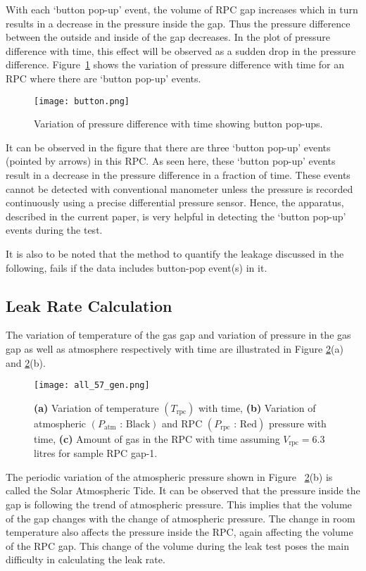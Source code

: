 With each `button pop-up' event, the volume of RPC gap increases which in turn results in a decrease in the pressure inside the gap. Thus the pressure difference between the outside and inside of the gap decreases. In the plot of pressure difference with time, this effect will be observed as a sudden drop in the pressure difference. Figure~\ref{fig:button} shows the variation of pressure difference with time for an RPC where there are `button pop-up' events. 
\begin{figure}
  \centering
  \texttt{[image: button.png]}
  \caption{Variation of pressure difference with time showing button pop-ups.}
  \label{fig:button}
\end{figure}
It can be observed in the figure that there are three `button pop-up' events (pointed by arrows) in this RPC. As seen here, these `button pop-up' events result in a decrease in the pressure difference in a fraction of time. These events cannot be detected with conventional manometer unless the pressure is recorded continuously using a precise differential pressure sensor. Hence, the apparatus, described in the current paper, is very helpful in detecting the `button pop-up' events during the test.

It is also to be noted that the method to quantify the leakage discussed in the following, fails if the data includes button-pop event(s) in it.

\subsection{Leak Rate Calculation}\label{sec:calculation}
The variation of temperature of the gas gap and variation of pressure in the gas gap as well as atmosphere respectively with time are illustrated in Figure \ref{fig:temp}(a) and \ref{fig:temp}(b). 
\begin{figure}[h]
  \centering
  \texttt{[image: all\_57\_gen.png]}
  \caption{\textbf{(a)} Variation of temperature $\left(T_{\textrm{rpc}}\right)$ with time, \textbf{(b)} Variation of atmospheric $\left(P_{\textrm{atm}}\text{ : Black}\right)$ and RPC $\left(P_{\textrm{rpc}}\text{ : Red}\right)$ pressure with time, \textbf{(c)} Amount of gas in the RPC with time assuming $V_{\textrm{rpc}}=6.3$\,litres for sample RPC gap-1.}
  \label{fig:temp}
\end{figure}
The periodic variation of the atmospheric pressure shown in Figure~ \ref{fig:temp}(b) is called the Solar Atmospheric Tide. It can be observed that the pressure inside the gap is following the trend of atmospheric pressure. This implies that the volume of the gap changes with the change of atmospheric pressure. The change in room temperature also affects the pressure inside the RPC, again affecting the volume of the RPC gap. This change of the volume during the leak test poses the main difficulty in calculating the leak rate.

